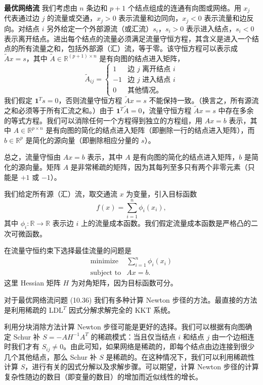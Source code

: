 \documentclass[UTF8,12pt,a4paper,fontset=fandol]{ctexart}
\begin{document}
\noindent\textbf{最优网络流}\quad
我们考虑由 $n$ 条边和 $p+1$ 个结点组成的连通有向图或网络。用 $x_j$ 代表通过边 $j$ 的流量或交通，$x_j>0$ 表示流量和边同向，$x_j<0$ 表示流量和边反向。对结点 $i$ 另外给定一个外部源流（或汇流）$s_i$，$s_i>0$ 表示进入结点，$s_i<0$ 表示离开结点。进出每个结点的流量必须满足流量守恒方程，其含义是进入一个结点的所有流量之和，包括外部源（汇）流，等于零。该守恒方程可以表示成 $\tilde A x=s$，其中 $\tilde A\in\mathbb{R}^{(p+1)\times n}$ 是有向图的结点进入矩阵，
\[
\tilde A_{ij}=
\begin{cases}
1 & \mbox{边 }j\mbox{ 离开结点 }i\\
-1 & \mbox{边 }j\mbox{ 进入结点 }i\\
0 & \mbox{其他情况。}
\end{cases}
\]
我们假定 $\mathbf{1}^Ts=0$，否则流量守恒方程 $\tilde A x=s$ 不能保持一致。（换言之，所有源流之和必须等于所有汇流之和。）由于 $\mathbf{1}^T\tilde A=0$，流量守恒方程 $\tilde A x=s$ 中存在多余的等式方程。我们可以消除任何一个方程得到独立的方程组，用 $Ax=b$ 表示，其中 $A\in\mathbb{R}^{p\times n}$ 是有向图的简化的结点进入矩阵（即删除一行的结点进入矩阵），而 $b\in\mathbb{R}^p$ 是简化的源向量（即删除相应分量的 $s$）。

总之，流量守恒由 $Ax=b$ 表示，其中 $A$ 是有向图的简化的结点进入矩阵，$b$ 是简化的源向量。矩阵 $A$ 是非常稀疏的矩阵，因为其每列至多只有两个非零元素（只能是 $+1$ 或 $-1$）。

我们给定所有源（汇）流，取交通流 $x$ 为变量，引入目标函数
\[
f(x)=\sum_{i=1}^n\phi_i(x_i),
\]
其中 $\phi_i:\mathbb{R}\to\mathbb{R}$ 表示边 $i$ 上的流量成本函数。我们假定流量成本函数是严格凸的二次可微函数。

在流量守恒约束下选择最佳流量的问题是
\begin{equation}
\begin{array}{ll}
\mbox{minimize} & \displaystyle\sum_{i=1}^n\phi_i(x_i)\\
\mbox{subject to} & Ax=b.
\end{array}
\tag{10.36}
\end{equation}
这里 Hessian 矩阵 $H$ 为对角矩阵，因为目标函数可分。

对于最优网络流问题 (10.36) 我们有多种计算 Newton 步径的方法。最直接的方法是利用稀疏的 LDL$^T$ 因式分解求解完全的 KKT 系统。

利用分块消除方法计算 Newton 步径可能是更好的选择。我们可以根据有向图确定 Schur 补 $S=-AH^{-1}A^T$ 的稀疏模式：当且仅当结点 $i$ 和结点 $j$ 由一个边相连时我们才有 $S_{ij}\neq0$。由此可知，如果网络是稀疏的，即每个结点由边连接到很少几个其他结点，那么 Schur 补 $S$ 是稀疏的。在这种情况下，我们可以利用稀疏性计算 $S$，进行有关的因式分解以及求解步骤。可以期望，计算 Newton 步径的计算复杂性随边的数目（即变量的数目）的增加而近似线性的增长。
\end{document}
